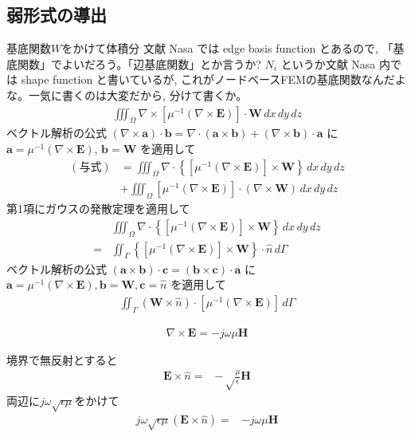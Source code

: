 \subsection{弱形式の導出}

基底関数$W$をかけて体積分
文献 Nasa では edge basis function とあるので,
「基底関数」でよいだろう。「辺基底関数」とか言うか?
$N_i$ というか文献 Nasa 内では shape function と書いているが,
これがノードベースFEMの基底関数なんだよな。一気に書くのは大変だから,
分けて書くか。
\begin{align}
\iiint_\Omega\nabla\times\left[
\mu^{-1}\left(\nabla\times\bm{E}\right)
\right]\cdot\bm{W}\,dx\,dy\,dz
\end{align}
ベクトル解析の公式
$\left(\nabla\times\bm{a}\right)\cdot\bm{b}
=\nabla\cdot\left(\bm{a}\times\bm{b}\right)
+\left(\nabla\times\bm{b}\right)\cdot\bm{a}$
に$\bm{a}=\mu^{-1}\left(\nabla\times\bm{E}\right)$, $\bm{b}=\bm{W}$
を適用して
\begin{align}
(\textrm{与式})&=
\iiint_\Omega\nabla\cdot
\left\{\left[\mu^{-1}
\left(\nabla\times\bm{E}\right)
\right]\times\bm{W}\right\}\,dx\,dy\,dz\\
&+\iiint_\Omega\left[\mu^{-1}\left(\nabla\times\bm{E}\right)\right]\cdot
\left(\nabla\times\bm{W}\right)\,dx\,dy\,dz
\end{align}
第1項にガウスの発散定理を適用して
\begin{align}
&\iiint_{\Omega}\nabla\cdot
\left\{\left[\mu^{-1}\left(\nabla\times\bm{E}\right)\right]\times\bm{W}\right\}
\,dx\,dy\,dz\\
=&\iint_\Gamma
\left\{\left[
\mu^{-1}\left(\nabla\times\bm{E}\right)
\right]\times\bm{W}\right\}\cdot\hat{n}
\,d\Gamma
\end{align}
ベクトル解析の公式
$\left(\bm{a}\times\bm{b}\right)\cdot\bm{c}
=\left(\bm{b}\times\bm{c}\right)\cdot\bm{a}$
に
$\bm{a}=\mu^{-1}\left(\nabla\times\bm{E}\right),
 \bm{b}=\bm{W}, \bm{c}=\hat{n}$
を適用して
\begin{align}
\iint_\Gamma
\left(\bm{W}\times\hat{n}\right)\cdot
\left[\mu^{-1}\left(\nabla\times\bm{E}\right)
\right]\,d\Gamma
\end{align}

\begin{align}
\nabla\times\bm{E}=-j\omega\mu\bm{H}
\end{align}

境界で無反射とすると
\begin{align}
\bm{E}\times\hat{n}=&-\sqrt\frac{\mu}{\epsilon}\bm{H}
\end{align}
両辺に$j\omega\sqrt{\epsilon\mu}$をかけて
\begin{align}
j\omega\sqrt{\epsilon\mu}\left(\bm{E}\times\hat{n}\right)=&-j\omega\mu\bm{H}
\end{align}

